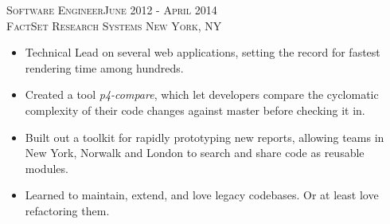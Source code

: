 \documentclass[oneside, final]{scrartcl}
\begin{document}
\begin{center}
\textsc{Software Engineer\hfill June 2012 - April 2014\\}
\textsc{FactSet Research Systems \hfill New York, NY\\}
\begin{itemize}
	\setlength{\itemsep}{1pt}
	\setlength{\parskip}{0pt}
	\setlength{\parsep}{0pt}
	\setlength{\leftmargin}{-5mm}
	\item Technical Lead on several web applications, setting the record for fastest rendering time among hundreds.
	\item Created a tool \textit{p4-compare}, which let developers compare the cyclomatic complexity of their code
	changes against master before checking it in.
	\item Built out a toolkit for rapidly prototyping new reports, allowing teams in New York, Norwalk and London to search and share code as reusable modules.
	\item Learned to maintain, extend, and love legacy codebases. Or at least love refactoring them.
\end{itemize}

\begin{comment}

\textsc{Full Stack Game Developer\hfill June 2008 - April 2012\\}
\textsc{Freelance\hfill New York, NY\\}
\begin{itemize}
	\setlength{\itemsep}{1pt}
	\setlength{\parskip}{0pt}
	\setlength{\parsep}{0pt}
	\setlength{\leftmargin}{-5mm}
	\item Created a new interface to a text-based MMORPG, to enhance and improve fundamental gameplay.
    \item Provided real-time analytics comparing 800+ registered users - at peak popularity 50k writes per day.
    \item Wrote bots to simulate human interaction, automating every aspect of gameplay. Required header-
            spoofing, captcha cracking, and basic NLP. (Don’t tell the admins!)
\end{itemize}



\end{comment}
\end{center}
\end{document}
